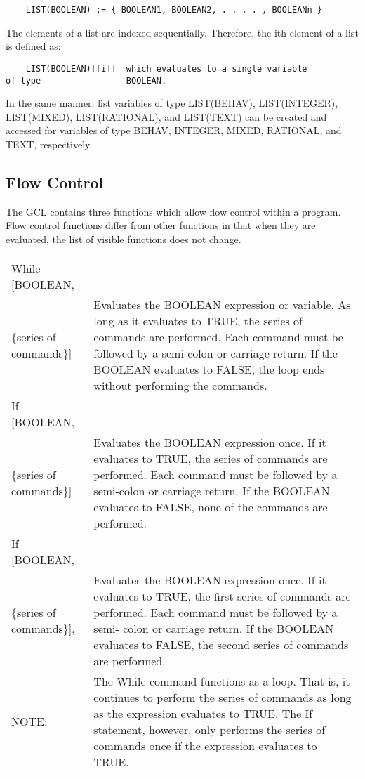 \begin{verbatim}
	LIST(BOOLEAN) := { BOOLEAN1, BOOLEAN2, . . . . , BOOLEANn }
\end{verbatim}

The elements of a list are indexed sequentially.  Therefore, the ith
element of a list is defined as:

\begin{verbatim}
	LIST(BOOLEAN)[[i]]	which evaluates to a single variable
of type 				BOOLEAN.
\end{verbatim}

\noindent
In the same manner, list variables of type LIST(BEHAV), LIST(INTEGER),
LIST(MIXED), LIST(RATIONAL), and LIST(TEXT) can be created and
accessed for variables of type BEHAV, INTEGER, MIXED, RATIONAL, and
TEXT, respectively.

\subsection{Flow Control}

The GCL contains three functions which allow flow control within a
program.  Flow control functions differ from other functions in that
when they are evaluated, the list of visible functions does not
change.

\medskip

\begin{tabular}{lp{4in}}
While [BOOLEAN, &\\
\{series of commands\}] & Evaluates the BOOLEAN
expression or variable.  As long as it evaluates to TRUE, the series
of commands are performed.  Each command must be followed by a
semi-colon or carriage return.  If the BOOLEAN evaluates to FALSE, the
loop ends without performing the commands.\\ If [BOOLEAN, & \\
\{series of commands\}] & Evaluates the BOOLEAN expression
once. If it evaluates to TRUE, the series of commands are performed.
Each command must be followed by a semi-colon or carriage return.  If
the BOOLEAN evaluates to FALSE, none of the commands are performed.\\
If [BOOLEAN, & \\
\{series of commands\}], & Evaluates the BOOLEAN expression
once. If it evaluates to TRUE, the first series of commands are
performed.  Each command must be followed by a semi- colon or carriage
return.  If the BOOLEAN evaluates to FALSE, the second series of
commands are performed. \\ NOTE: & The While command functions as a
loop.  That is, it continues to perform the series of commands as long
as the expression evaluates to TRUE.  The If statement, however, only
performs the series of commands once if the expression evaluates to
TRUE.
\end{tabular}

